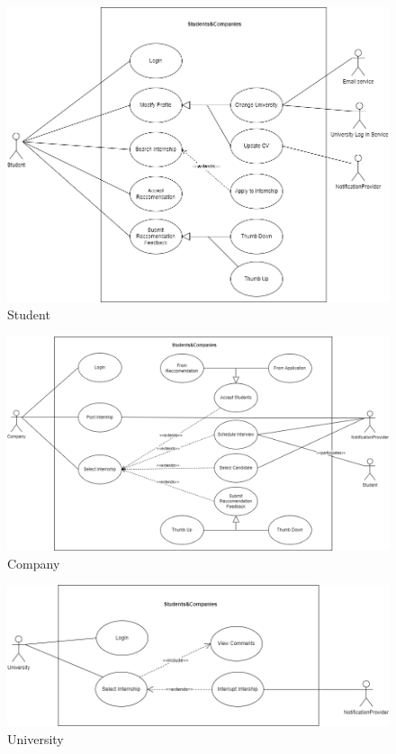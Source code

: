 \documentclass{article}
\begin{document}
\begin{figure}[H]
    \centering
    \includegraphics[scale = 0.45]{figures/UseCasesDiagrams/StudentUC.drawio.png}
    \caption{Student}
    \centering
\end{figure}
\begin{figure}[H]
    \centering
    \includegraphics[scale = 0.4]{figures/UseCasesDiagrams/CompanyUC.drawio.png}
    \caption{Company}
    \centering
\end{figure}
\begin{figure}[H]
    \centering
    \includegraphics[scale = 0.45]{figures/UseCasesDiagrams/use_case_1-University.drawio.png}
    \caption{University}
    \centering
\end{figure}
\end{document}
